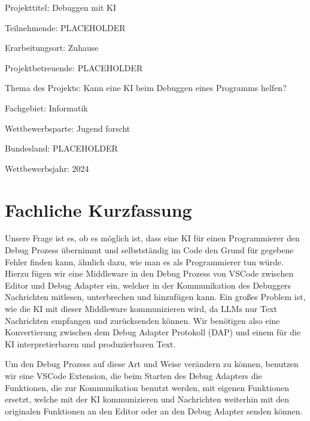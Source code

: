 \documentclass[a4paper,12pt,ngerman]{scrartcl}
\begin{document}
\begin{titlepage}
	Projekttitel: Debuggen mit KI
	\vspace{1cm}
	
	Teilnehmende: PLACEHOLDER
	
	Erarbeitungsort: Zuhause
	
	Projektbetreuende: PLACEHOLDER
	
	Thema des Projekts: Kann eine KI beim Debuggen eines Programms helfen?
	
	Fachgebiet: Informatik
	
	Wettbewerbsparte: Jugend forscht
	
	Bundesland: PLACEHOLDER
	
	Wettbewerbsjahr: 2024
	
	\vspace{2cm}
	\vfill
\end{titlepage}
\clearpage
\tableofcontents
\clearpage

\section{Fachliche Kurzfassung}

Unsere Frage ist es, ob es möglich ist, dass eine KI für einen Programmierer den Debug Prozess übernimmt und selbstständig im Code den Grund für gegebene Fehler finden kann, ähnlich dazu, wie man es als Programmierer tun würde. Hierzu fügen wir eine Middleware in den Debug Prozess von VSCode zwischen Editor und Debug Adapter ein, welcher in der Kommunikation des Debuggers Nachrichten mitlesen, unterbrechen und hinzufügen kann. Ein großes Problem ist, wie die KI mit dieser Middleware kommunizieren wird, da LLMs nur Text Nachrichten empfangen und zurücksenden können. Wir benötigen also eine Konvertierung zwischen dem Debug Adapter Protokoll (DAP) und einem für die KI interpretierbaren und produzierbaren Text.

Um den Debug Prozess auf diese Art und Weise verändern zu können, benutzen wir eine VSCode Extension, die beim Starten des Debug Adapters die Funktionen, die zur Kommunikation benutzt werden, mit eigenen Funktionen ersetzt, welche mit der KI kommunizieren und Nachrichten weiterhin mit den originalen Funktionen an den Editor oder an den Debug Adapter senden können.
\end{document}
